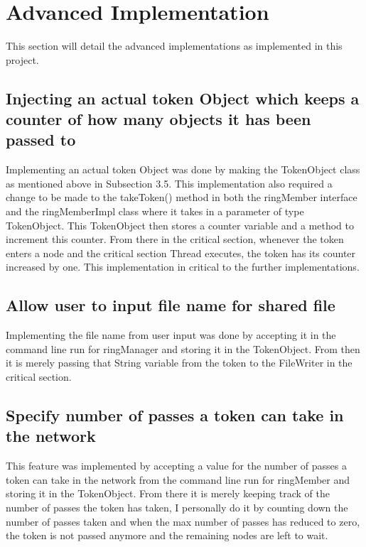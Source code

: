 \documentclass[11pt, a4paper]{article}
\begin{document}
\newpage

\section{Advanced Implementation}
This section will detail the advanced implementations as implemented in this project.

\subsection{Injecting an actual token Object which keeps a counter of how many objects it has been passed to}

Implementing an actual token Object was done by making the TokenObject class as mentioned above in Subsection 3.5. This implementation also required a change to be made to the takeToken() method in both the ringMember interface and the ringMemberImpl class where it takes in a parameter of type TokenObject. This TokenObject then stores a counter variable and a method to increment this counter. From there in the critical section, whenever the token enters a node and the critical section Thread executes, the token has its counter increased by one. This implementation in critical to the further implementations. 

\subsection{Allow user to input file name for shared file}

Implementing the file name from user input was done by accepting it in the command line run for ringManager and storing it in the TokenObject. From then it is merely passing that String variable from the token to the FileWriter in the critical section. 

\subsection{Specify number of passes a token can take in the network}

This feature was implemented by accepting a value for the number of passes a token can take in the network from the command line run for ringMember and storing it in the TokenObject. From there it is merely keeping track of the number of passes the token has taken, I personally do it by counting down the number of passes taken and when the max number of passes has reduced to zero, the token is not passed anymore and the remaining nodes are left to wait.
\end{document}

